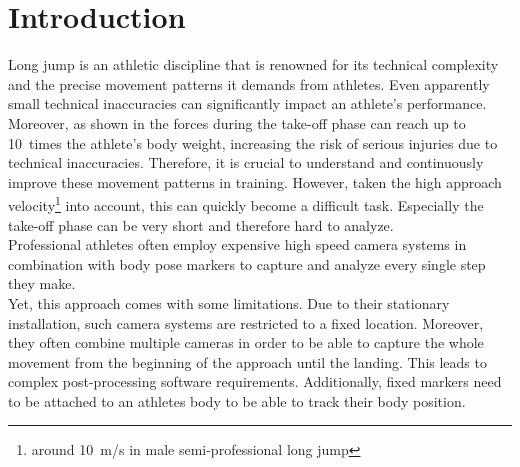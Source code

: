 \chapter{Introduction}
Long jump is an athletic discipline that is renowned for its technical
complexity and the precise movement patterns it demands from athletes.
Even apparently small technical inaccuracies can significantly impact an
athlete's performance.
Moreover, as shown in \cite{long_jump_dynamics} the forces during the take-off 
phase can reach up to 10~times the athlete's body weight, 
increasing the risk of serious injuries due to technical inaccuracies.
Therefore, it is crucial to understand and continuously improve these movement 
patterns in training.
However, taken the high approach velocity\footnote{around 10~m/s in male 
semi-professional long jump} into account, this can quickly become a difficult 
task.
Especially the take-off phase can be very short and therefore hard to analyze.\\

\noindent Professional athletes often employ expensive high speed camera 
systems in combination with body pose markers to capture and analyze every 
single step they make.\\
Yet, this approach comes with some limitations.
Due to their stationary installation, such camera systems are restricted to a
fixed location.
Moreover, they often combine multiple cameras in order to be able to capture 
the whole movement from the beginning of the approach until the 
landing.
This leads to complex post-processing software requirements.
Additionally, fixed markers need to be attached to an athletes body to be able 
to track their body position.\\

